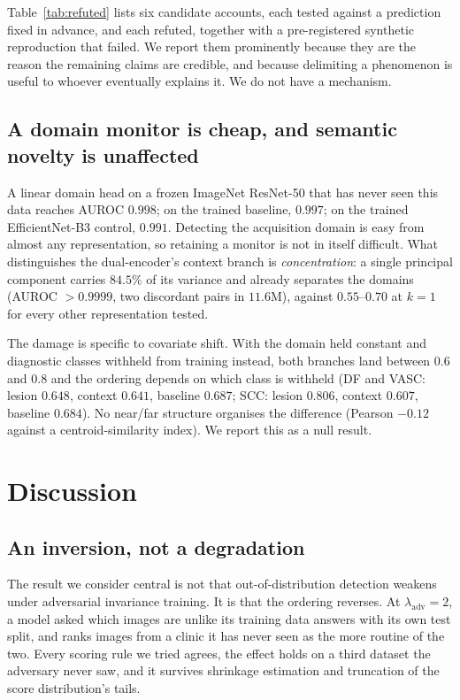 \documentclass[11pt,a4paper]{article}
\newcommand{\lam}{\lambda_{\mathrm{adv}}}
\begin{document}
Table~\ref{tab:refuted} lists six candidate accounts, each tested against a prediction
fixed in advance, and each refuted, together with a pre-registered synthetic
reproduction that failed. We report them prominently because they are the reason the
remaining claims are credible, and because delimiting a phenomenon is useful to whoever
eventually explains it. We do not have a mechanism.

\subsection{A domain monitor is cheap, and semantic novelty is unaffected}

A linear domain head on a frozen ImageNet ResNet-50 that has never seen this data
reaches AUROC $0.998$; on the trained baseline, $0.997$; on the trained EfficientNet-B3
control, $0.991$. Detecting the acquisition domain is easy from almost any
representation, so retaining a monitor is not in itself difficult. What distinguishes
the dual-encoder's context branch is \emph{concentration}: a single principal component
carries $84.5\%$ of its variance and already separates the domains
(AUROC $>0.9999$, two discordant pairs in $11.6$M), against $0.55$--$0.70$ at $k = 1$
for every other representation tested.

The damage is specific to covariate shift. With the domain held constant and diagnostic
classes withheld from training instead, both branches land between $0.6$ and $0.8$ and
the ordering depends on which class is withheld (DF and VASC: lesion $0.648$, context
$0.641$, baseline $0.687$; SCC: lesion $0.806$, context $0.607$, baseline $0.684$). No
near/far structure organises the difference (Pearson $-0.12$ against a
centroid-similarity index). We report this as a null result.

\section{Discussion}

\subsection{An inversion, not a degradation}

The result we consider central is not that out-of-distribution detection weakens
under adversarial invariance training. It is that the ordering reverses. At
$\lam = 2$, a model asked which images are unlike its training data answers with
its own test split, and ranks images from a clinic it has never seen as the more
routine of the two. Every scoring rule we tried agrees, the effect holds on a
third dataset the adversary never saw, and it survives shrinkage estimation and
truncation of the score distribution's tails.
\end{document}
